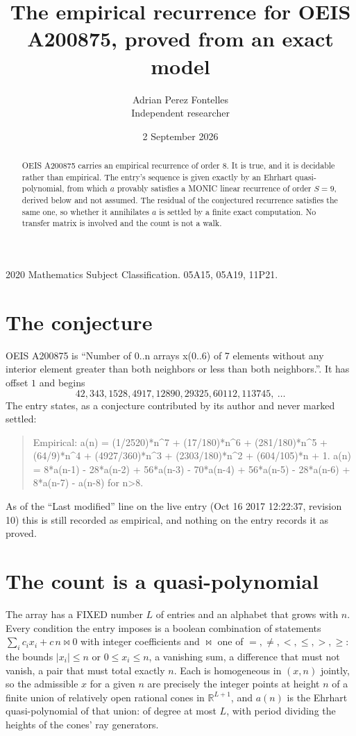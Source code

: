\documentclass[11pt,a4paper]{article}
\title{The empirical recurrence for OEIS A200875, proved from an exact model}
\author{Adrian Perez Fontelles\\ \small Independent researcher}
\date{2 September 2026}
\theoremstyle{plain}
\theoremstyle{definition}
\begin{document}
\maketitle

\begin{abstract}
OEIS A200875 carries an empirical recurrence of order $8$. It is true, and it is
decidable rather than empirical. The entry's sequence is given exactly by an Ehrhart quasi-polynomial, from
which $a$ provably satisfies a MONIC linear recurrence of order $S=9$, derived below and not
assumed. The residual of the conjectured recurrence satisfies the same one, so whether it
annihilates $a$ is settled by a finite exact computation. No transfer matrix is involved and
the count is not a walk.
\end{abstract}

\noindent\small 2020 Mathematics Subject Classification. 05A15, 05A19, 11P21.\normalsize

\section{The conjecture}

OEIS A200875 is ``Number of 0..n arrays x(0..6) of 7 elements without any interior element greater than both neighbors or less than both neighbors.''. It has offset $1$ and begins
\[
42, 343, 1528, 4917, 12890, 29325, 60112, 113745,\ \dots
\]
The entry states, as a conjecture contributed by its author and never marked settled:
\begin{quote}
Empirical: a(n) = (1/2520)*n\^{}7 + (17/180)*n\^{}6 + (281/180)*n\^{}5 + (64/9)*n\^{}4 + (4927/360)*n\^{}3 + (2303/180)*n\^{}2 + (604/105)*n + 1. a(n) = 8*a(n-1) - 28*a(n-2) + 56*a(n-3) - 70*a(n-4) + 56*a(n-5) - 28*a(n-6) + 8*a(n-7) - a(n-8) for n>8.
\end{quote}
As of the ``Last modified'' line on the live entry (Oct 16 2017 12:22:37, revision 10)
this is still recorded as empirical, and nothing on the entry records it as proved.

\section{The count is a quasi-polynomial}

The array has a FIXED number $L$ of entries and an alphabet that grows with $n$. Every
condition the entry imposes is a boolean combination of statements
$\sum_i c_ix_i + c\,n \bowtie 0$ with integer coefficients and $\bowtie$ one of
$=,\ne,<,\le,>,\ge$: the bounds $|x_i|\le n$ or $0\le x_i\le n$, a vanishing sum, a difference
that must not vanish, a pair that must total exactly $n$. Each is homogeneous in $(x,n)$
jointly, so the admissible $x$ for a given $n$ are precisely the integer points at height $n$
of a finite union of relatively open rational cones in $\mathbb{R}^{L+1}$, and $a(n)$ is
the Ehrhart quasi-polynomial of that union: of degree at most $L$, with period dividing the
heights of the cones' ray generators.
\end{document}
